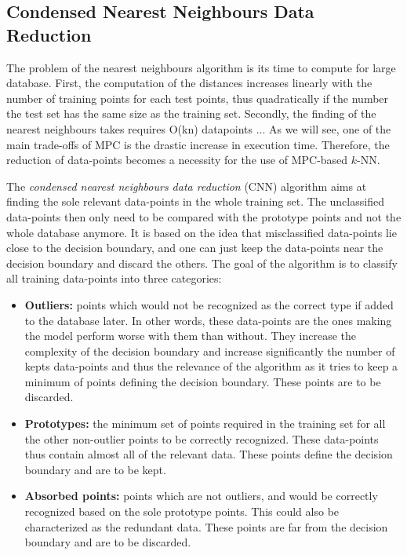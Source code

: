 \subsection{Condensed Nearest Neighbours Data Reduction}
The problem of the nearest neighbours algorithm is its time to compute for large database. First, the computation of the distances increases linearly with the number of training points for each test points, thus quadratically if the number the test set has the same size as the training set. Secondly, the finding of the nearest neighbours takes requires O(kn) datapoints ... As we will see, one of the main trade-offs of MPC is the drastic increase in execution time. Therefore, the reduction of data-points becomes a necessity for the use of MPC-based $k$-NN.

The \emph{condensed nearest neighbours data reduction} (CNN) algorithm aims at finding the sole relevant data-points in the whole training set. The unclassified data-points then only need to be compared with the prototype points and not the whole database anymore. It is based on the idea that misclassified data-points lie close to the decision boundary, and one can just keep the data-points near the decision boundary and discard the others. The goal of the algorithm is to classify all training data-points into three categories:
\begin{itemize}
    \item \textbf{Outliers:} points which would not be recognized as the correct type if added to the database later. In other words, these data-points are the ones making the model perform worse with them than without. They increase the complexity of the decision boundary and increase significantly the number of kepts data-points and thus the relevance of the algorithm as it tries to keep a minimum of points defining the decision boundary. These points are to be discarded.
    \item \textbf{Prototypes:} the minimum set of points required in the training set for all the other non-outlier points to be correctly recognized. These data-points thus contain almost all of the relevant data. These points define the decision boundary and are to be kept.
    \item \textbf{Absorbed points:} points which are not outliers, and would be correctly recognized based on the sole prototype points. This could also be characterized as the redundant data. These points are far from the decision boundary and are to be discarded.
\end{itemize}

